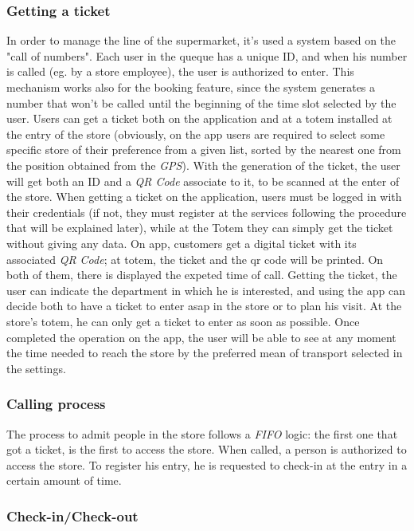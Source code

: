 \documentclass{article}
\begin{document}
		\subsubsection{Getting a ticket}
		
		In order to manage the line of the supermarket, it's used a system based on the "call of numbers". Each user in the queque has a unique ID, and when his number is called (eg. by a store employee), the user is authorized to enter. This mechanism works also for the booking feature, since the system generates a number that won't be called until the beginning of the time slot selected by the user. Users can get a ticket both on the application and at a totem installed at the entry of the store (obviously, on the app users are required to select some specific store of their preference from a given list, sorted by the nearest one from the position obtained from the \emph{GPS}). With the generation of the ticket, the user will get both an ID and a \emph{QR Code} associate to it, to be scanned at the enter of the store. When getting a ticket on the application, users must be logged in with their credentials (if not, they must register at the services following the procedure that will be explained later), while at the Totem they can simply get the ticket without giving any data. On app, customers get a digital ticket with its associated \emph{QR Code}; at totem, the ticket and the qr code will be printed. On both of them, there is displayed the expeted time of call. Getting the ticket, the user can indicate the department in which he is interested, and using the app can decide both to have a ticket to enter asap in the store or to plan his visit. At the store's totem, he can only get a ticket to enter as soon as possible. Once completed the operation on the app, the user will be able to see at any moment the time needed to reach the store by the preferred mean of transport selected in the settings.
		
		\subsubsection{Calling process}
		
		The process to admit people in the store follows a \emph{FIFO} logic: the first one that got a ticket, is the first to access the store. When called, a person is authorized to access the store. To register his entry, he is requested to check-in at the entry in a certain amount of time.
		
		\subsubsection{Check-in/Check-out}
		
\end{document}

